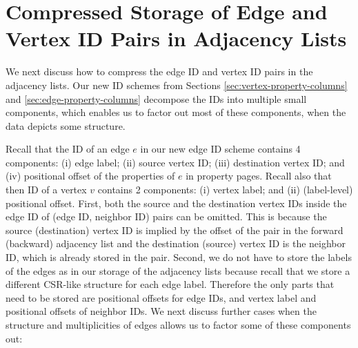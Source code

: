 \section{Compressed Storage of Edge and Vertex ID Pairs in Adjacency Lists}
\label{sec:storage-optimizations}

We next discuss how to compress the edge ID and vertex ID pairs in the adjacency lists. Our new ID schemes from Sections \ref{sec:vertex-property-columns} and \ref{sec:edge-property-columns} decompose the IDs into multiple small components, which enables us to factor out most of these components, when the data depicts some structure. 

Recall that the ID of an edge $e$ in our new edge ID scheme contains 4 components: (i) edge label; (ii) source vertex ID; (iii) destination vertex ID; and (iv) positional offset of the properties of $e$ in property pages. Recall also that then ID of a vertex $v$ contains 2 components: (i) vertex label; and (ii) (label-level) positional offset. First, both the source and the destination vertex IDs inside the edge ID of (edge ID, neighbor ID) pairs can be omitted. This is because the source (destination) vertex ID is implied by the offset of the pair in the forward (backward) adjacency list and the destination (source) vertex ID is the neighbor ID, which is already stored in the pair. Second, we do not have to store the labels of the edges as in our storage of the adjacency lists because recall that we store a different CSR-like structure for each edge label. Therefore the only parts that need to be stored are positional offsets for edge IDs, and vertex label and positional offsets of neighbor IDs. We next discuss further cases when the structure and multiplicities of edges allows us to factor some of these components out: 


